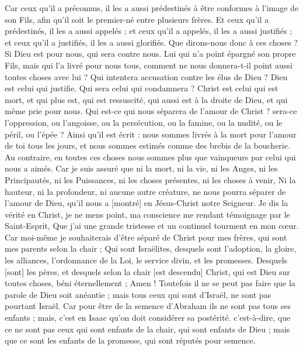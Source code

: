 \begin{multicols}{2}
Car ceux qu'il a préconnus, il les a aussi prédestinés à être conformes à l'image de son Fils, afin qu'il soit le premier-né entre plusieurs frères.
Et ceux qu'il a prédestinés, il les a aussi appelés ; et ceux qu'il a appelés, il les a aussi justifiés ; et ceux qu'il a justifiés, il les a aussi glorifiés.
Que dirons-nous donc à ces choses ? Si Dieu est pour nous, qui sera contre nous.
Lui qui n'a point épargné son propre Fils, mais qui l'a livré pour nous tous, comment ne nous donnera-t-il point aussi toutes choses avec lui ?
Qui intentera accusation contre les élus de Dieu ? Dieu est celui qui justifie.
Qui sera celui qui condamnera ? Christ est celui qui est mort, et qui plus est, qui est ressuscité, qui aussi est à la droite de Dieu, et qui même prie pour nous.
Qui est-ce qui nous séparera de l'amour de Christ ? sera-ce l'oppression, ou l'angoisse, ou la persécution, ou la famine, ou la nudité, ou le péril, ou l'épée ?
Ainsi qu'il est écrit : nous sommes livrés à la mort pour l'amour de toi tous les jours, et nous sommes estimés comme des brebis de la boucherie.
Au contraire, en toutes ces choses nous sommes plus que vainqueurs par celui qui nous a aimés.
Car je suis assuré que ni la mort, ni la vie, ni les Anges, ni les Principautés, ni les Puissances, ni les choses présentes, ni les choses à venir,
Ni la hauteur, ni la profondeur, ni aucune autre créature, ne nous pourra séparer de l'amour de Dieu, qu'il nous a [montré] en Jésus-Christ notre Seigneur.
\VerseOne{}Je dis la vérité en Christ, je ne mens point, ma conscience me rendant témoignage par le Saint-Esprit,
Que j'ai une grande tristesse et un continuel tourment en mon cœur.
Car moi-même je souhaiterais d'être séparé de Christ pour mes frères, qui sont mes parents selon la chair ;
Qui sont Israëlites, desquels sont l'adoption, la gloire, les alliances, l'ordonnance de la Loi, le service divin, et les promesses.
Desquels [sont] les pères, et desquels selon la chair [est descendu] Christ, qui est Dieu sur toutes choses, béni éternellement ; Amen !
Toutefois il ne se peut pas faire que la parole de Dieu soit anéantie ; mais tous ceux qui sont d'Israël, ne sont pas pourtant Israël.
Car pour être de la semence d'Abraham ils ne sont pas tous ses enfants ; mais, c'est en Isaac qu'on doit considérer sa postérité.
c'est-à-dire, que ce ne sont pas ceux qui sont enfants de la chair, qui sont enfants de Dieu ; mais que ce sont les enfants de la promesse, qui sont réputés pour semence.

\end{multicols}
